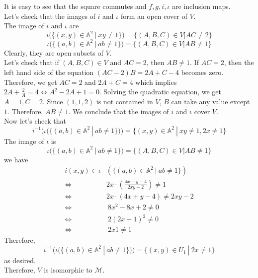 \begin{example}
It is easy to see that the square commutes and $f,g,i,\iota$ are inclusion maps.
\\
Let's check that the images of $i$ and $\iota$ form an open cover of $V$.\\
The image of $i$ and $\iota$ are
\[
	i( \{(x,y)\in \mathbb{A}^2~|~xy\neq 1 \})=\{(A,B,C)\in V| AC\neq 2\}
\]
\[
	\iota ( \{(a,b)\in \mathbb{A}^2~|~ab\neq 1 \})=\{(A,B,C)\in V| AB\neq 1\}
\]
Clearly, they are open subsets of $V$.\\
Let's check that if $(A,B,C)\in V$ and $AC=2$, then $AB\neq1$. If $AC=2$, then the left hand side of the equation $(AC-2)B=2A+C-4$ becomes zero. Therefore, we get $AC=2$ and $2A+C=4$ which implies $2A+\frac{2}{A}=4\Leftrightarrow A^2-2A+1=0$. Solving the quadratic equation, we get $A=1,C=2$. Since $(1,1,2)$ is not contained in $V$, $B$ can take any value except $1$. Therefore, $AB\neq 1$. We conclude that the images of $i$ and $\iota$ cover $V$.\\
Now let's check that 
\[
	i^{-1}(
	\iota (\{(a,b)\in \mathbb{A}^2~|~ab\neq 1 \})
	)
		=
	\{
	(x,y)\in \mathbb{A}^2~|~
	xy\neq 1,2x\neq 1 	
	\}
\]
The image of $\iota$ is
\[
	\iota ( \{(a,b)\in \mathbb{A}^2~|~ab\neq 1 \})=\{(A,B,C)\in V| AB\neq 1\}
\]
we have
\begin{align*}
i(x,y)\in \iota &(\{(a,b)\in \mathbb{A}^2~|~ab\neq 1 \})\\ \Longleftrightarrow & 2x\cdot (\frac{4x+y-4}{2xy-2})\neq 1\\
\Longleftrightarrow & 2x\cdot(4x+y-4)\neq 2xy-2\\
\Longleftrightarrow &~8x^2-8x+2\neq 0 \\
\Longleftrightarrow &~2(2x-1)^2\neq 0\\
\Longleftrightarrow &~2x1\neq 1 
\end{align*}
Therefore,
\[
	i^{-1}(
	\iota (\{(a,b)\in \mathbb{A}^2~|~ab\neq 1 \})
	)
		=
	\{
	(x,y)\in \overline{U}_1~|~
	2x\neq 1 	
	\}
\]
as desired.\\
Therefore, $V$ is isomorphic to $\mathcal{M}$.
\end{example}


